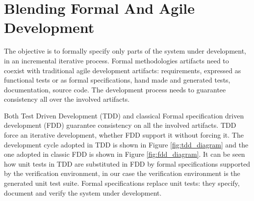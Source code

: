 \documentclass[english]{lni}
\begin{document}
\section{Blending Formal And Agile Development}
\label{sec:blending_formal_and_agile_development}

The objective is to formally specify only parts of the system under development, in an incremental iterative process.
Formal methodologies artifacts need to coexist with traditional agile development artifacts: requirements, expressed as functional tests or as formal specifications, hand made and generated tests, documentation, source code.
The development process needs to guarantee consistency all over the involved artifacts.

Both Test Driven Development (TDD) and classical Formal specification driven development (FDD) guarantee consistency on all the involved artifacts. 
TDD force an iterative development, whether FDD support it without forcing it.
The development cycle adopted in TDD is shown in Figure \ref{fig:tdd_diagram} and the one adopted in classic FDD is shown in Figure \ref{fig:fdd_diagram}.
It can be seen how unit tests in TDD are substituted in FDD by formal specifications supported by the verification environment, in our case the verification environment is the generated unit test suite.
Formal specifications replace unit tests: they specify, document and verify the system under development.
\end{document}
